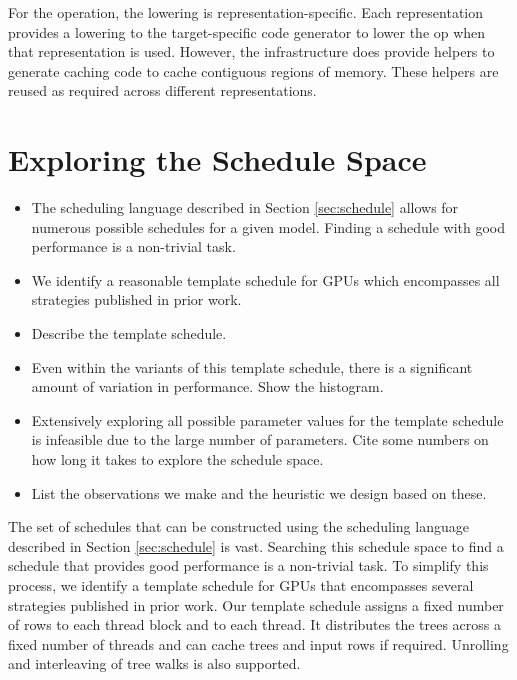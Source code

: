 For the  operation, the lowering is representation-specific. Each representation
provides a lowering to the target-specific code generator to lower the  op when
that representation is used. However, the \Treebeard{} infrastructure does provide helpers 
to generate caching code to cache contiguous regions of memory. These helpers are reused 
as required across different representations. 

\section{Exploring the Schedule Space}
\label{sec:exploring}

\begin{itemize}
  \item The scheduling language described in Section \ref{sec:schedule} allows
  for numerous possible schedules for a given model. 
  Finding a schedule with good performance is a non-trivial task.
  \item We identify a reasonable template schedule for GPUs which encompasses
  all strategies published in prior work.
  \item Describe the template schedule.
  \item Even within the variants of this template schedule, there is a significant 
  amount of variation in performance. Show the histogram. 
  \item Extensively exploring all possible parameter values for the template schedule 
  is infeasible due to the large number of parameters.
  Cite some numbers on how long it takes to explore the schedule space.
  \item List the observations we make and the heuristic we design based on these.
\end{itemize}

The set of schedules that can be constructed using the scheduling language described in 
Section \ref{sec:schedule} is vast. Searching this schedule space to find a schedule that
provides good performance is a non-trivial task. To simplify this process, we identify a
template schedule for GPUs that encompasses several strategies published in prior work.
Our template schedule assigns a fixed number of rows to each thread block and to each thread.
It distributes the trees across a fixed number of threads and can cache trees and 
input rows if required. Unrolling and interleaving of tree walks is also supported.

